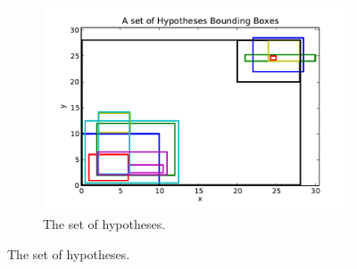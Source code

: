 \begin{figure}[hbt]
\begin{subfigure}[b]{0.32\textwidth}
        \centering
        \includegraphics[width=\textwidth]{visBB}
        \caption{The set of hypotheses.}
        \label{fig:slvqs_bb}
    \end{subfigure}%


\end{figure}
